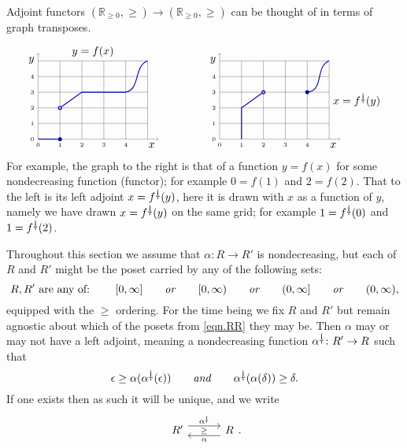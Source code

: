 \documentclass[11pt, one side, article]{memoir}
\newcommand{\adjpos}[6][30pt]{%
\begin{tikzcd}[ampersand replacement=\&, column sep=#1]
  #2\ar[r, shift left=4.5pt, "#3"]
  \ar[r, phantom, "\scriptstyle#6"]\&
  #5\ar[l, shift left=4.5pt, "#4"]
\end{tikzcd}
}
\theoremstyle{definition}
\theoremstyle{plain}
\newcommand{\ldag}{^{\rotatebox{180}{$\dagger$}}}
\newcommand{\tn}[1]{\textnormal{#1}}
\newcommand{\rr}{\mathbb{R}}
\newcommand{\hh}[2][]{#1 \tn{\textit{#2}} #1}
\newcommand{\qqand}{\hh[\qquad]{and}}
\newcommand{\rrnon}{\rr_{\geq0}}
\begin{document}
Adjoint functors $(\rrnon,\geq)\to(\rrnon,\geq)$ can be thought of in terms of graph transposes.
\[
\begin{tikzpicture}[x=.7cm, y=.5cm]
	\draw [xstep=1, ystep=1, very thin] (0,0) grid (5,5);
	\draw [very thin, ->] (5,0) -- (5.5, 0) node[below left] {$x$};
	\draw [very thin, ->] (0,5) -- (0, 5.5) node[below left] {$y$};
	\begin{scope}[blue!70!black, thick]
  	\node[circle, draw, inner sep=1pt, fill] at (1,0) (ccl) {};
  	\node[circle, draw, inner sep=1pt] 			 at (1,2) (cop) {};
		\draw (0,0) -- (ccl);
		\draw (cop) -- (2,3) -- (4,3) to[out=10, in=200] (5,5);
	\end{scope}
	\foreach \i in {0,..., 4} {
		\node[left, font=\tiny] at (0, \i) {\i};
		\node[below, font=\tiny] at (\i, 0) {\i};
	}
	\node[above] at (2.5, 5) {$y=f(x)$};
\end{tikzpicture}
\hspace{.6in}
\begin{tikzpicture}[x=.7cm, y=.5cm]
	\draw [xstep=1, ystep=1, very thin] (0,0) grid (5,5);
	\draw [very thin, ->] (5,0) -- (5.5, 0) node[below left] {$x$};
	\draw [very thin, ->] (0,5) -- (0, 5.5) node[below left] {$y$};
	\begin{scope}[blue!70!black, thick]
  	\node[circle, draw, inner sep=1pt, fill] at (4,3) (ccl) {};
  	\node[circle, draw, inner sep=1pt] 			 at (2,3) (cop) {};
		\draw (1,0) -- (1,2) -- (cop);
		\draw (ccl) to[out=10, in=200] (5,5);
	\end{scope}
	\foreach \i in {0,..., 4} {
		\node[left, font=\tiny] at (0, \i) {\i};
		\node[below, font=\tiny] at (\i, 0) {\i};
	}
	\node[right] at (5, 2.5) {$x=f\ldag(y)$};
\end{tikzpicture}
\]
For example, the graph to the right is that of a function $y=f(x)$ for some nondecreasing function (functor); for example $0=f(1)$ and $2=f(2)$. That to the left is its left adjoint $x=f\ldag(y)$, here it is drawn with $x$ as a function of $y$, namely we have drawn $x=f\ldag(y)$ on the same grid; for example $1=f\ldag(0)$ and $1=f\ldag(2)$. 



Throughout this section we assume that $\alpha\colon R\to R'$ is nondecreasing, but each of $R$ and $R'$ might be the poset carried by any of the following sets:
\begin{equation}\label{eqn.RR}
	R,R'\text{~are any of:~}\qquad
	[0,\infty]\hh[\qquad]{or}
	[0,\infty)\hh[\qquad]{or}
	(0,\infty]\hh[\qquad]{or}
	(0,\infty),
\end{equation}
equipped with the $\geq$ ordering. For the time being we fix $R$ and $R'$ but remain agnostic about which of the posets from \eqref{eqn.RR} they may be. Then $\alpha$ may or may not have a left adjoint, meaning a nondecreasing function $\alpha\ldag\colon R'\to R$ such that
\begin{equation}\label{eqn.unit_counit}
  \epsilon\geq\alpha(\alpha\ldag(\epsilon))
  \qqand
  \alpha\ldag(\alpha(\delta))\geq\delta.
\end{equation}
If one exists then as such it will be unique, and we write
\[
\adjpos{R'}{\alpha\ldag}{\alpha}{R}{\geq}.
\]
\end{document}
